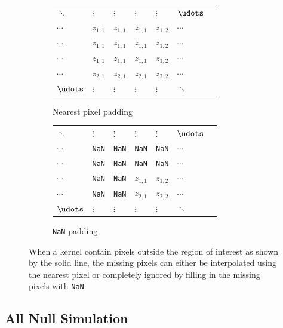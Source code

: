 \begin{figure}
	\centering
	\begin{subfigure}[b]{0.49\textwidth}
	    \begin{tabular}{lllllll}
	       $\ddots$ & $\vdots$ & $\vdots$ & $\vdots$ & $\vdots$ & $\udots$ \\
	       $\cdots$ & $z_{1,1}$ & $z_{1,1}$ & $z_{1,1}$ & $z_{1,2}$ & $\cdots$ \\
	       $\cdots$ & $z_{1,1}$ & $z_{1,1}$ & $z_{1,1}$ & $z_{1,2}$ & $\cdots$ \\ \cline{4-6}
	       $\cdots$ & $z_{1,1}$ & \multicolumn{1}{l|}{$z_{1,1}$} & $z_{1,1}$ & $z_{1,2}$ & $\cdots$ \\
	       $\cdots$ & $z_{2,1}$ & \multicolumn{1}{l|}{$z_{2,1}$}  & $z_{2,1}$ & $z_{2,2}$ & $\cdots$ \\
	       $\udots$ & $\vdots$ & \multicolumn{1}{l|}{$\vdots$}  & $\vdots$ & $\vdots$ & $\ddots$
		\end{tabular}
		\caption{Nearest pixel padding}
	\end{subfigure}
	\begin{subfigure}[b]{0.49\textwidth}
	    \begin{tabular}{lllllll}
	       $\ddots$ & $\vdots$ & $\vdots$ & $\vdots$ & $\vdots$ & $\udots$ \\
	       $\cdots$ & \texttt{NaN} & \texttt{NaN} & \texttt{NaN} & \texttt{NaN} & $\cdots$ \\
	       $\cdots$ & \texttt{NaN} & \texttt{NaN} & \texttt{NaN} & \texttt{NaN} & $\cdots$ \\ \cline{4-6}
	       $\cdots$ & \texttt{NaN} & \multicolumn{1}{l|}{\texttt{NaN}} & $z_{1,1}$ & $z_{1,2}$ & $\cdots$ \\
	       $\cdots$ & \texttt{NaN} & \multicolumn{1}{l|}{\texttt{NaN}}  & $z_{2,1}$ & $z_{2,2}$ & $\cdots$ \\
	       $\udots$ & $\vdots$ & \multicolumn{1}{l|}{$\vdots$}  & $\vdots$ & $\vdots$ & $\ddots$
		\end{tabular}
		\caption{\texttt{NaN} padding}
	\end{subfigure}
	\caption{When a kernel contain pixels outside the region of interest as shown by the solid line, the missing pixels can either be interpolated using the nearest pixel or completely ignored by filling in the missing pixels with \texttt{NaN}.}
	\label{fig:inference_padding}
\end{figure}

\subsection{All Null Simulation}

